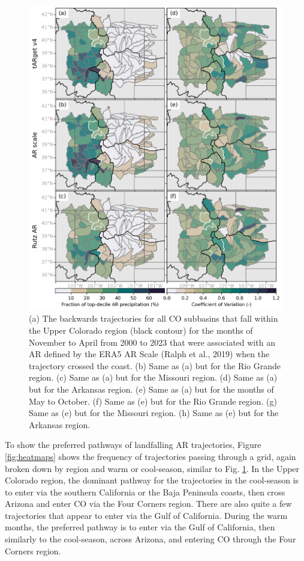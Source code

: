 \documentclass[draft]{agujournal2019}
\begin{document}
\begin{figure}
\noindent\includegraphics[width=\textwidth, height=\textheight, keepaspectratio]{fig3.png}
\caption{(a) The backwards trajectories for all CO subbasins that fall within the Upper Colorado region (black contour) for the months of November to April from 2000 to 2023 that were associated with an AR defined by the ERA5 AR Scale (Ralph et al., 2019) when the trajectory crossed the coast. (b) Same as (a) but for the Rio Grande region. (c) Same as (a) but for the Missouri region. (d) Same as (a) but for the Arkansas region. (e) Same as (a) but for the months of May to October. (f) Same as (e) but for the Rio Grande region. (g) Same as (e) but for the Missouri region. (h) Same as (e) but for the Arkansas region.}
\label{fig:spaghetti_plot}
\end{figure}


To show the preferred pathways of landfalling AR trajectories, Figure \ref{fig:heatmaps} shows the frequency of trajectories passing through a grid, again broken down by region and warm or cool-season, similar to Fig. \ref{fig:spaghetti_plot}. In the Upper Colorado region, the dominant pathway for the trajectories in the cool-season is to enter via the southern California or the Baja Peninsula coasts, then cross Arizona and enter CO via the Four Corners region. There are also quite a few trajectories that appear to enter via the Gulf of California. During the warm months, the preferred pathway is to enter via the Gulf of California, then similarly to the cool-season, across Arizona, and entering CO through the Four Corners region. 
\end{document}

